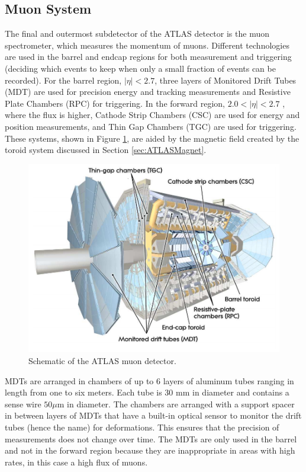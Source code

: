 \subsection{Muon System}
\label{sec:MuCal}
The final and outermost subdetector of the ATLAS detector is the muon spectrometer, which measures the momentum of muons.  Different technologies are used in the barrel and endcap regions for both measurement and triggering (deciding which events to keep when only a small fraction of events can be recorded).  For the barrel region, $|\eta|<2.7$, three layers of Monitored Drift Tubes (MDT) are used for precision energy and tracking measurements and Resistive Plate Chambers (RPC) for triggering.  In the forward region, $2.0<|\eta|<2.7$ , where the flux is higher, Cathode Strip Chambers (CSC) are used for energy and position measurements, and Thin Gap Chambers (TGC) are used for triggering.  These systems, shown in Figure \ref{fig:ATLASMuonSys}, are aided by the magnetic field created by the toroid system discussed in Section \ref{sec:ATLASMagnet}.
\begin{figure}[ht!]
	\centering
	\includegraphics[width=\columnwidth]{../ThesisImages/LHCImages/ATLASMuonSystem.png}
	\caption[Schematic of the ATLAS muon detector.]{Schematic of the ATLAS muon detector\cite{ATLAS}.
	}
	\label{fig:ATLASMuonSys}
\end{figure}

MDTs are arranged in chambers of up to 6 layers of aluminum tubes ranging in length from one to six meters.  Each tube is 30 mm in diameter and contains a sense wire $50\mu\text{m}$ in diameter.  The chambers are arranged with a support spacer in between layers of MDTs that have a built-in optical sensor to monitor the drift tubes (hence the name) for deformations.  This ensures that the precision of measurements does not change over time.  The MDTs are only used in the barrel and not in the forward region because they are inappropriate in areas with high rates, in this case a high flux of muons. 


